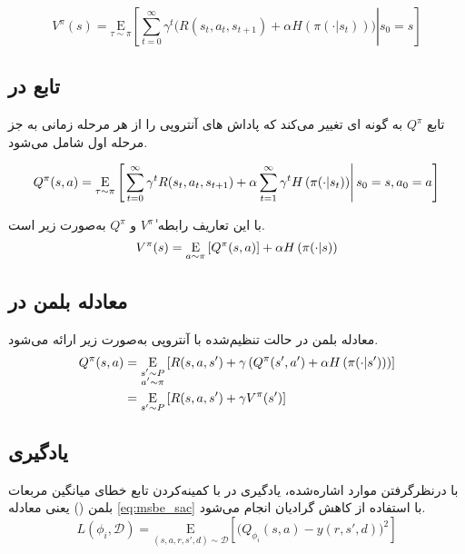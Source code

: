              \begin{equation}
             	V^{\pi}(s) = \underset{\tau \sim \pi}{\mathrm E}{ \left. \left[ \sum_{t=0}^{\infty} \gamma^t \bigg( R(s_t, a_t, s_{t+1}) + \alpha H\left(\pi(\cdot|s_t)\right) \bigg) \right| s_0 = s\right] }
             \end{equation}
             
             
            \subsection{تابع 
            در }
            تابع
            \(Q^{\pi}\)
             به گونه ای تغییر می‌کند که پاداش های آنتروپی را از هر مرحله زمانی به جز مرحله اول شامل می‌شود.
             
             \begin{equation}
             	Q^{\pi}(s,a) = \underset{\tau \sim \pi}{\mathrm{E}}\left[
             { \left. \sum_{t=0}^{\infty} \gamma^t  R(s_t, a_t, s_{t+1}) + \alpha \sum_{t=1}^{\infty} \gamma^t H\left(\pi(\cdot|s_t)\right)\right| s_0 = s, a_0 = a}
             \right]
             \end{equation}
             
       با این تعاریف رابطه
       ٰ\(V^{\pi}\)
       و 
       \(Q^{\pi}\)
        به‌صورت زیر است.
        \begin{equation}
         V^{\pi}(s) = \underset{a \sim \pi}{\mathrm{E}}\left[
         {Q^{\pi}(s,a)} 
         \right]+ \alpha H\left(\pi(\cdot|s)\right)
        \end{equation}
        
        
       \subsection{معادله بلمن در }
       معادله بلمن در حالت تنظیم‌شده با آنتروپی به‌صورت زیر ارائه می‌شود.
       \begin{align}
       	Q^{\pi}(s,a) &=\underset{\substack{s' \sim P \\ a' \sim \pi}}{\mathrm{E}} 
       	\left[
       	{R(s,a,s') + \gamma\left(Q^{\pi}(s',a') + \alpha H\left(\pi(\cdot|s')\right) \right)}
       	\right] \\
       	&= \underset{s' \sim P}{\mathrm{E}}\left[
       	{R(s,a,s') + \gamma V^{\pi}(s')}
       	\right]
       \end{align}
       
       \subsection{یادگیری }
                 با درنظرگرفتن موارد اشاره‌شده، یادگیری  در  با کمینه‌کردن تابع خطای میانگین مربعات بلمن () یعنی معادله \eqref{eq:msbe_sac} با استفاده از کاهش گرادیان
       انجام می‌شود.
       \begin{equation}
       	\label{eq:msbe_sac}
       	L(\phi_i, {\mathcal D}) = \underset{(s,a,r,s',d) \sim {\mathcal D}}{{\mathrm E}}\left[
       	\Bigg( Q_{\phi_i}(s,a) - y(r,s',d) \Bigg)^2
       	\right]
       \end{equation}
       
